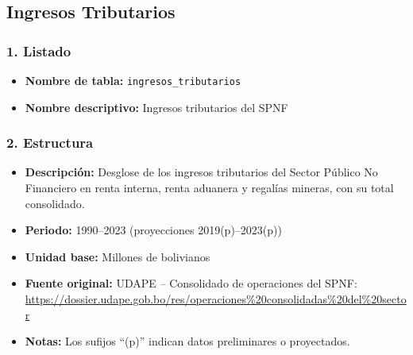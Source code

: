 \documentclass[12pt,a4paper]{article}
\begin{document}
\subsection{Ingresos Tributarios}

\subsubsection*{1. Listado}
\begin{itemize}
  \item \textbf{Nombre de tabla:} \texttt{ingresos\_tributarios}
  \item \textbf{Nombre descriptivo:} Ingresos tributarios del SPNF
\end{itemize}

\subsubsection*{2. Estructura}
\begin{itemize}
  \item \textbf{Descripción:} Desglose de los ingresos tributarios del Sector Público No Financiero en renta interna, renta aduanera y regalías mineras, con su total consolidado.
  \item \textbf{Periodo:} 1990–2023 (proyecciones 2019(p)–2023(p))
  \item \textbf{Unidad base:} Millones de bolivianos
  \item \textbf{Fuente original:} UDAPE – Consolidado de operaciones del SPNF:\\
    \url{https://dossier.udape.gob.bo/res/operaciones%20consolidadas%20del%20sector}
  \item \textbf{Notas:} Los sufijos “(p)” indican datos preliminares o proyectados.
\end{itemize}
\end{document}
